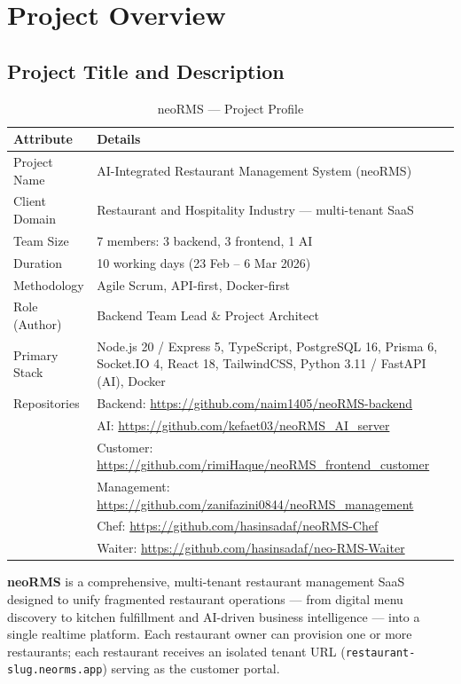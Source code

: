 \chapter{Project Overview}
\label{ch:project}

\section{Project Title and Description}
\label{sec:project_title}

\begin{table}[H]
\centering
\caption{neoRMS --- Project Profile}
\label{tab:neorms_profile}
\begin{tabularx}{\textwidth}{@{}p{}X@{}}
\toprule
\textbf{Attribute} & \textbf{Details} \\
\midrule
Project Name & AI-Integrated Restaurant Management System (neoRMS) \\
Client Domain & Restaurant and Hospitality Industry --- multi-tenant SaaS \\
Team Size & 7 members: 3 backend, 3 frontend, 1 AI \\
Duration & 10 working days (23 Feb -- 6 Mar 2026) \\
Methodology & Agile Scrum, API-first, Docker-first \\
Role (Author) & Backend Team Lead \& Project Architect \\
Primary Stack & Node.js 20 / Express 5, TypeScript, PostgreSQL 16, Prisma 6, Socket.IO 4, React 18, TailwindCSS, Python 3.11 / FastAPI (AI), Docker \\
Repositories & Backend: \url{https://github.com/naim1405/neoRMS-backend} \\
 & AI: \url{https://github.com/kefaet03/neoRMS_AI_server} \\
 & Customer: \url{https://github.com/rimiHaque/neoRMS_frontend_customer} \\
 & Management: \url{https://github.com/zanifazini0844/neoRMS_management} \\
 & Chef: \url{https://github.com/hasinsadaf/neoRMS-Chef} \\
 & Waiter: \url{https://github.com/hasinsadaf/neo-RMS-Waiter} \\
\bottomrule
\end{tabularx}
\end{table}

\textbf{neoRMS} is a comprehensive, multi-tenant restaurant management SaaS designed to unify fragmented restaurant operations --- from digital menu discovery to kitchen fulfillment and AI-driven business intelligence --- into a single realtime platform. Each restaurant owner can provision one or more restaurants; each restaurant receives an isolated tenant URL (\texttt{restaurant-slug.neorms.app}) serving as the customer portal.


